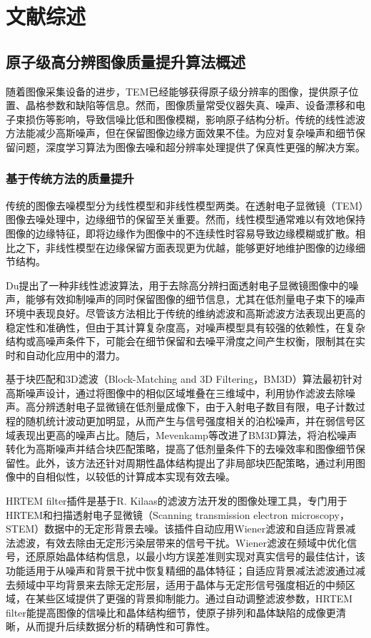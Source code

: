 \chapter{文献综述}

\section{原子级高分辨图像质量提升算法概述}
随着图像采集设备的进步，TEM已经能够获得原子级分辨率的图像，提供原子位置、晶格参数和缺陷等信息。然而，图像质量常受仪器失真、噪声、设备漂移和电子束损伤等影响，导致信噪比低和图像模糊，影响原子结构分析。传统的线性滤波方法能减少高斯噪声，但在保留图像边缘方面效果不佳。为应对复杂噪声和细节保留问题，深度学习算法为图像去噪和超分辨率处理提供了保真性更强的解决方案。

\subsection{基于传统方法的质量提升}
传统的图像去噪模型分为线性模型和非线性模型两类。在透射电子显微镜（TEM）图像去噪处理中，边缘细节的保留至关重要。然而，线性模型通常难以有效地保持图像的边缘特征，即将边缘作为图像中的不连续性时容易导致边缘模糊或扩散。相比之下，非线性模型在边缘保留方面表现更为优越，能够更好地维护图像的边缘细节结构。

Du\cite{du2015nonlinear}提出了一种非线性滤波算法，用于去除高分辨扫面透射电子显微镜图像中的噪声，能够有效抑制噪声的同时保留图像的细节信息，尤其在低剂量电子束下的噪声环境中表现良好。尽管该方法相比于传统的维纳滤波和高斯滤波方法表现出更高的稳定性和准确性，但由于其计算复杂度高，对噪声模型具有较强的依赖性，在复杂结构或高噪声条件下，可能会在细节保留和去噪平滑度之间产生权衡，限制其在实时和自动化应用中的潜力。

基于块匹配和3D滤波（Block-Matching and 3D Filtering，BM3D）算法\cite{dabov2007image}最初针对高斯噪声设计，通过将图像中的相似区域堆叠在三维域中，利用协作滤波去除噪声。高分辨透射电子显微镜在低剂量成像下，由于入射电子数目有限，电子计数过程的随机统计波动更加明显，从而产生与信号强度相关的泊松噪声，并在弱信号区域表现出更高的噪声占比。随后，Mevenkamp等\cite{mevenkamp2015poisson}改进了BM3D算法，将泊松噪声转化为高斯噪声并结合块匹配策略，提高了低剂量条件下的去噪效率和图像细节保留性。此外，该方法还针对周期性晶体结构提出了非局部块匹配策略，通过利用图像中的自相似性，以较低的计算成本实现有效去噪。

HRTEM filter插件是基于R. Kilaas的滤波方法\cite{kilaas1998optimal}开发的图像处理工具，专门用于HRTEM和扫描透射电子显微镜（Scanning transmission electron microscopy，STEM）数据中的无定形背景去噪。该插件自动应用Wiener滤波和自适应背景减法滤波，有效去除由无定形污染层带来的信号干扰。Wiener滤波在频域中优化信号，还原原始晶体结构信息，以最小均方误差准则实现对真实信号的最佳估计，该功能适用于从噪声和背景干扰中恢复精细的晶体特征；自适应背景减法滤波通过减去频域中平均背景来去除无定形层，适用于晶体与无定形信号强度相近的中频区域，在某些区域提供了更强的背景抑制能力。通过自动调整滤波参数，HRTEM filter能提高图像的信噪比和晶体结构细节，使原子排列和晶体缺陷的成像更清晰，从而提升后续数据分析的精确性和可靠性。
 
